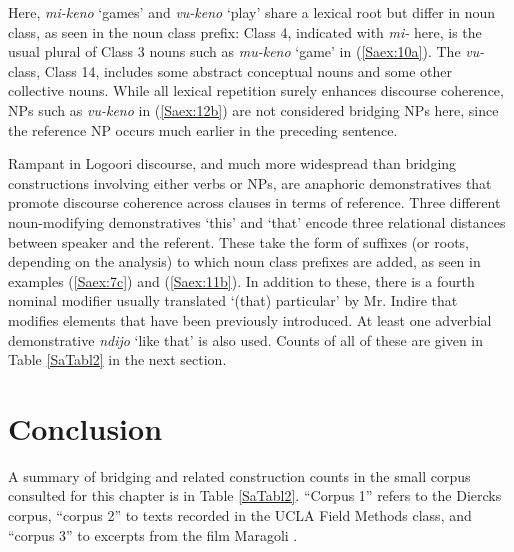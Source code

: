 \documentclass[output=paper]{LSP/langsci}
\begin{document}
Here, \textit{mi-keno} `games' and \textit{vu-keno} `play' share a lexical root but differ in noun class, as seen in the noun class prefix: Class 4, indicated with \textit{mi-}  here, is the usual plural of Class 3 nouns such as \textit{mu-keno} `game' in (\ref{Saex:10a}). The \textit{vu-} class, Class 14, includes some abstract conceptual nouns and some other collective nouns. While all lexical repetition surely enhances discourse coherence, NPs such as \textit{vu-keno} in (\ref{Saex:12b}) are not considered bridging NPs here, since the reference NP occurs much earlier in the preceding sentence.

Rampant in Logoori discourse, and much more widespread than bridging constructions involving either verbs or NPs, are anaphoric demonstratives that promote discourse coherence across clauses in terms of reference. Three different noun-modifying demonstratives `this' and `that' encode three relational distances between speaker and the referent. These take the form of suffixes (or roots, depending on the analysis) to which noun class prefixes are added, as seen in examples (\ref{Saex:7c}) and (\ref{Saex:11b}). In addition to these, there is a fourth nominal modifier usually translated `(that) particular' by Mr. Indire that modifies elements that have been previously introduced. At least one adverbial demonstrative \textit{ndijo} `like that' is also used. Counts of all of these are given in Table \ref{SaTabl2} in the next section.
%
\section{Conclusion}
\label{Saconcl}
A summary of bridging and related construction counts in the small corpus consulted for this chapter is in Table \ref{SaTabl2}. ``Corpus 1'' refers to the Diercks corpus, ``corpus 2'' to texts recorded in the UCLA Field Methods class, and ``corpus 3'' to excerpts from the film Maragoli \citep{Nichols1976}.
\end{document}
